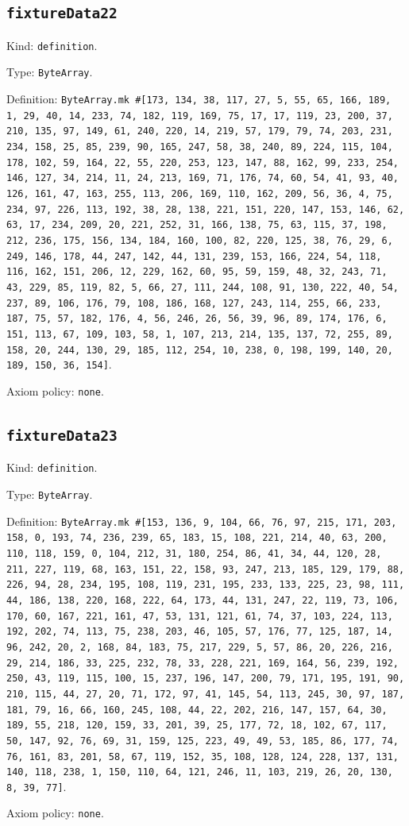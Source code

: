 \documentclass[11pt]{article}
\begin{document}
\subsection*{\texttt{fixtureData22}}
\noindent Kind: \texttt{definition}.\par
\noindent Type: \texttt{ByteArray}.\par
\noindent Definition: \texttt{ByteArray.mk \#[173, 134, 38, 117, 27, 5, 55, 65, 166, 189, 1, 29, 40, 14, 233, 74, 182, 119, 169, 75, 17, 17, 119, 23, 200, 37, 210, 135, 97, 149, 61, 240, 220, 14, 219, 57, 179, 79, 74, 203, 231, 234, 158, 25, 85, 239, 90, 165, 247, 58, 38, 240, 89, 224, 115, 104, 178, 102, 59, 164, 22, 55, 220, 253, 123, 147, 88, 162, 99, 233, 254, 146, 127, 34, 214, 11, 24, 213, 169, 71, 176, 74, 60, 54, 41, 93, 40, 126, 161, 47, 163, 255, 113, 206, 169, 110, 162, 209, 56, 36, 4, 75, 234, 97, 226, 113, 192, 38, 28, 138, 221, 151, 220, 147, 153, 146, 62, 63, 17, 234, 209, 20, 221, 252, 31, 166, 138, 75, 63, 115, 37, 198, 212, 236, 175, 156, 134, 184, 160, 100, 82, 220, 125, 38, 76, 29, 6, 249, 146, 178, 44, 247, 142, 44, 131, 239, 153, 166, 224, 54, 118, 116, 162, 151, 206, 12, 229, 162, 60, 95, 59, 159, 48, 32, 243, 71, 43, 229, 85, 119, 82, 5, 66, 27, 111, 244, 108, 91, 130, 222, 40, 54, 237, 89, 106, 176, 79, 108, 186, 168, 127, 243, 114, 255, 66, 233, 187, 75, 57, 182, 176, 4, 56, 246, 26, 56, 39, 96, 89, 174, 176, 6, 151, 113, 67, 109, 103, 58, 1, 107, 213, 214, 135, 137, 72, 255, 89, 158, 20, 244, 130, 29, 185, 112, 254, 10, 238, 0, 198, 199, 140, 20, 189, 150, 36, 154]}.\par
\noindent Axiom policy: \texttt{none}.\par
\subsection*{\texttt{fixtureData23}}
\noindent Kind: \texttt{definition}.\par
\noindent Type: \texttt{ByteArray}.\par
\noindent Definition: \texttt{ByteArray.mk \#[153, 136, 9, 104, 66, 76, 97, 215, 171, 203, 158, 0, 193, 74, 236, 239, 65, 183, 15, 108, 221, 214, 40, 63, 200, 110, 118, 159, 0, 104, 212, 31, 180, 254, 86, 41, 34, 44, 120, 28, 211, 227, 119, 68, 163, 151, 22, 158, 93, 247, 213, 185, 129, 179, 88, 226, 94, 28, 234, 195, 108, 119, 231, 195, 233, 133, 225, 23, 98, 111, 44, 186, 138, 220, 168, 222, 64, 173, 44, 131, 247, 22, 119, 73, 106, 170, 60, 167, 221, 161, 47, 53, 131, 121, 61, 74, 37, 103, 224, 113, 192, 202, 74, 113, 75, 238, 203, 46, 105, 57, 176, 77, 125, 187, 14, 96, 242, 20, 2, 168, 84, 183, 75, 217, 229, 5, 57, 86, 20, 226, 216, 29, 214, 186, 33, 225, 232, 78, 33, 228, 221, 169, 164, 56, 239, 192, 250, 43, 119, 115, 100, 15, 237, 196, 147, 200, 79, 171, 195, 191, 90, 210, 115, 44, 27, 20, 71, 172, 97, 41, 145, 54, 113, 245, 30, 97, 187, 181, 79, 16, 66, 160, 245, 108, 44, 22, 202, 216, 147, 157, 64, 30, 189, 55, 218, 120, 159, 33, 201, 39, 25, 177, 72, 18, 102, 67, 117, 50, 147, 92, 76, 69, 31, 159, 125, 223, 49, 49, 53, 185, 86, 177, 74, 76, 161, 83, 201, 58, 67, 119, 152, 35, 108, 128, 124, 228, 137, 131, 140, 118, 238, 1, 150, 110, 64, 121, 246, 11, 103, 219, 26, 20, 130, 8, 39, 77]}.\par
\noindent Axiom policy: \texttt{none}.\par
\end{document}
